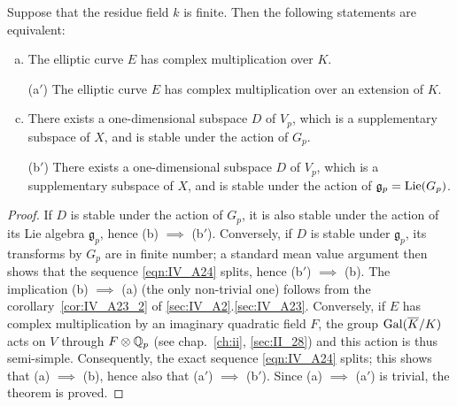 \begin{subappendices}
\begin{thm}
	Suppose that the residue field $k$ is finite. Then the
	following statements are equivalent:
	\begin{enumerate}[(a)]
	\item The elliptic curve $E$ has complex multiplication over $K$.
	\item[(a$'$)] The elliptic curve $E$ has complex multiplication over an
		extension of $K$.
	\item There exists a one-dimensional subspace $D$ of $V_p$, which is a
		supplementary subspace of $X$, and is stable under the action
		of $G_p$.
	\item[(b$'$)]\label{thm:IV_A24_bp}
		There exists a one-dimensional subspace $D$ of $V_p$, which is a
		supplementary subspace of $X$, and is stable under the action
		of $\mathfrak{g}_p = \operatorname{Lie}(G_p)$.
	\end{enumerate}
\end{thm}
\begin{proof}
If $D$ is stable under the action of $G_p$, it is also stable under the action
of its Lie algebra $\mathfrak{g}_p$, hence (b) $\implies$ (b$'$).
Conversely, if $D$ is stable under $\mathfrak{g}_p$, its transforms by $G_p$
are in finite number; a standard mean value argument then shows that the
sequence \eqref{eqn:IV_A24} splits, hence (b$'$) $\implies$ (b).
The implication (b) $\implies$ (a) (the only non-trivial one) follows from the
corollary~\ref{cor:IV_A23_2} of \ref{sec:IV_A2}.\ref{sec:IV_A23}. 
Conversely, if $E$ has complex multiplication by an imaginary quadratic field
$F$, the group $\operatorname{Gal}(\overline{K}/K)$ acts on $V$ through $F \otimes \mathbb{Q}_p$ (see
chap.~\ref{ch:ii}, \ref{sec:II_28}) and this action is thus semi-simple.
Consequently, the
\dpage
exact sequence \eqref{eqn:IV_A24} splits; this shows that (a) $\implies$ (b),
hence also that (a$'$) $\implies$ (b$'$). Since (a) $\implies$ (a$'$) is
trivial, the theorem is proved.
\end{proof}


\end{subappendices}
